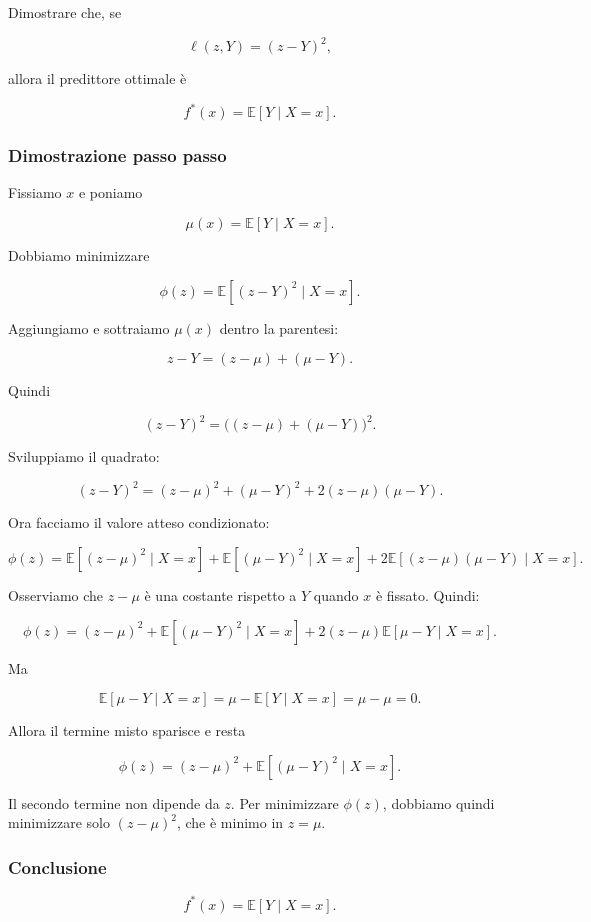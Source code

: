 \documentclass{article}
\begin{document}
Dimostrare che, se

\[
\ell(z,Y)=(z-Y)^2,
\]

allora il predittore ottimale è

\[
f^*(x)=\mathbb{E}[Y\mid X=x].
\]

\subsubsection{Dimostrazione passo
passo}\label{dimostrazione-passo-passo}

Fissiamo \(x\) e poniamo

\[
\mu(x)=\mathbb{E}[Y\mid X=x].
\]

Dobbiamo minimizzare

\[
\phi(z)=\mathbb{E}[(z-Y)^2\mid X=x].
\]

Aggiungiamo e sottraiamo \(\mu(x)\) dentro la parentesi:

\[
z-Y = (z-\mu) + (\mu-Y).
\]

Quindi

\[
(z-Y)^2 = \big((z-\mu)+(\mu-Y)\big)^2.
\]

Sviluppiamo il quadrato:

\[
(z-Y)^2 = (z-\mu)^2 + (\mu-Y)^2 + 2(z-\mu)(\mu-Y).
\]

Ora facciamo il valore atteso condizionato:

\[
\phi(z)=\mathbb{E}[(z-\mu)^2\mid X=x]
+ \mathbb{E}[(\mu-Y)^2\mid X=x]
+ 2\mathbb{E}[(z-\mu)(\mu-Y)\mid X=x].
\]

Osserviamo che \(z-\mu\) è una costante rispetto a \(Y\) quando \(x\) è
fissato. Quindi:

\[
\phi(z)=(z-\mu)^2 + \mathbb{E}[(\mu-Y)^2\mid X=x]
+2(z-\mu)\mathbb{E}[\mu-Y\mid X=x].
\]

Ma

\[
\mathbb{E}[\mu-Y\mid X=x]
= \mu - \mathbb{E}[Y\mid X=x]
= \mu-\mu=0.
\]

Allora il termine misto sparisce e resta

\[
\phi(z)=(z-\mu)^2 + \mathbb{E}[(\mu-Y)^2\mid X=x].
\]

Il secondo termine non dipende da \(z\). Per minimizzare \(\phi(z)\),
dobbiamo quindi minimizzare solo \((z-\mu)^2\), che è minimo in
\(z=\mu\).

\subsubsection{Conclusione}\label{conclusione}

\[
f^*(x)=\mathbb{E}[Y\mid X=x].
\]
\end{document}
